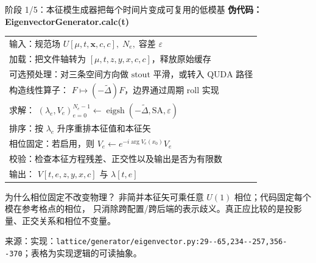 \documentclass[UTF8,aspectratio=169,11pt]{ctexbeamer}
\newcommand{\source}[1]{%
  \vspace{0.06em}\par{\raggedright\scriptsize\color{muted}来源：#1\par}}
\newcommand{\codepath}[1]{\nolinkurl{#1}}
\begin{document}
\begin{frame}[t]{阶段 1/5：本征模生成器把每个时间片变成可复用的低模基}
  \centering
  \textbf{伪代码：EigenvectorGenerator.calc(t)}
  \vspace{0.08cm}
  \begin{tabular}{@{}l@{}}
    $\text{输入：规范场 }U[\mu,t,\boldsymbol x,c,c],\;N_e,\;\text{容差 }\varepsilon$ \\
    $\text{加载：把文件轴转为 }[\mu,t,z,y,x,c,c]\text{，释放原始缓存}$ \\
    $\text{可选预处理：对三条空间方向做 stout 平滑，或转入 QUDA 路径}$ \\
    $\text{构造线性算子： }F\mapsto(-\widetilde\Delta)F\text{，边界通过周期 roll 实现}$ \\
    $\text{求解： }(\lambda_e,V_e)_{e=0}^{N_e-1}\gets\operatorname{eigsh}(-\widetilde\Delta,\text{SA},\varepsilon)$ \\
    $\text{排序：按 }\lambda_e\text{ 升序重排本征值和本征矢}$ \\
    $\text{相位固定：若启用，则 }V_e\gets e^{-i\arg V_e(x_0)}V_e$ \\
    $\text{校验：检查本征方程残差、正交性以及输出是否为有限数}$ \\
    $\text{输出： }V[t,e,z,y,x,c]\text{ 与 }\lambda[t,e]$ \\
  \end{tabular}
  \vspace{0.04cm}
  \begin{block}{为什么相位固定不改变物理？}
    \small
    非简并本征矢可乘任意 $U(1)$ 相位；代码固定每个模在参考格点的相位，
    只消除跨配置/跨后端的表示歧义。真正应比较的是投影量、正交关系和相位不变量。
  \end{block}
  \source{实现：\codepath{lattice/generator/eigenvector.py:29--65,234--257,356--370}；表格为实现逻辑的可读抽象。}
\end{frame}
\end{document}
